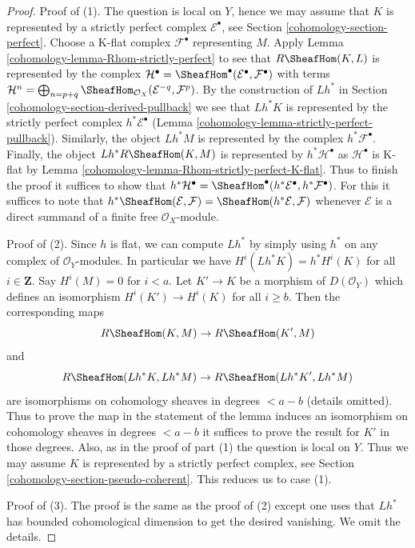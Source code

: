 \begin{proof}

Proof of (1). The question is local on $Y$, hence we may assume that
$K$ is represented by a strictly perfect complex
$\mathcal{E}^\bullet$, see Section \ref{cohomology-section-perfect}.
Choose a K-flat complex $\mathcal{F}^\bullet$ representing $M$.
Apply Lemma \ref{cohomology-lemma-Rhom-strictly-perfect} to see that
$R\SheafHom(K, L)$ is represented by the complex
$\mathcal{H}^\bullet =
\SheafHom^\bullet(\mathcal{E}^\bullet, \mathcal{F}^\bullet)$
with terms $\mathcal{H}^n = \bigoplus\nolimits_{n = p + q}
\SheafHom_{\mathcal{O}_X}(\mathcal{E}^{-q}, \mathcal{F}^p)$.
By the construction of $Lh^*$ in Section \ref{cohomology-section-derived-pullback}
we see that $Lh^*K$ is represented by the strictly perfect complex
$h^*\mathcal{E}^\bullet$ (Lemma \ref{cohomology-lemma-strictly-perfect-pullback}).
Similarly, the object $Lh^*M$ is represented by
the complex $h^*\mathcal{F}^\bullet$.
Finally, the object $Lh^*R\SheafHom(K, M)$
is represented by $h^*\mathcal{H}^\bullet$ as
$\mathcal{H}^\bullet$ is K-flat by
Lemma \ref{cohomology-lemma-Rhom-strictly-perfect-K-flat}.
Thus to finish the proof it suffices to show that
$h^*\mathcal{H}^\bullet =
\SheafHom^\bullet(h^*\mathcal{E}^\bullet, h^*\mathcal{F}^\bullet)$.
For this it suffices to note that
$h^*\SheafHom(\mathcal{E}, \mathcal{F}) =
\SheafHom(h^*\mathcal{E}, \mathcal{F})$
whenever $\mathcal{E}$ is a direct summand of a finite free
$\mathcal{O}_X$-module.

\medskip\noindent
Proof of (2). Since $h$ is flat, we can compute $Lh^*$
by simply using $h^*$ on any complex of $\mathcal{O}_Y$-modules.
In particular we have $H^i(Lh^*K) = h^*H^i(K)$ for all $i \in \mathbf{Z}$.
Say $H^i(M) = 0$ for $i < a$. Let $K' \to K$ be a morphism
of $D(\mathcal{O}_Y)$ which defines an isomorphism
$H^i(K') \to H^i(K)$ for all $i \geq b$. Then the corresponding maps
$$
R\SheafHom(K, M) \to R\SheafHom(K', M)
$$
and
$$
R\SheafHom(Lh^*K, Lh^*M) \to R\SheafHom(Lh^*K', Lh^*M)
$$
are isomorphisms on cohomology sheaves in degrees $< a - b$ (details omitted).
Thus to prove the map in the statement of the lemma induces an
isomorphism on cohomology sheaves in degrees $< a - b$ it suffices to
prove the result for $K'$ in those degrees. Also, as in the proof
of part (1) the question is local on $Y$. Thus we may assume $K$ is
represented by a strictly perfect complex, see
Section \ref{cohomology-section-pseudo-coherent}. This reduces us to case (1).

\medskip\noindent
Proof of (3). The proof is the same as the proof of (2) except one
uses that $Lh^*$ has bounded cohomological dimension to get the
desired vanishing. We omit the details.
\end{proof}

